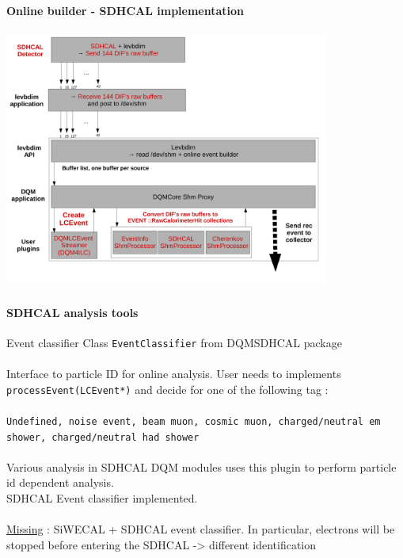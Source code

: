 \documentclass[8pt]{beamer}
\begin{document}
  \begin{frame}[containsverbatim]
    \frametitle{\secname}
    \framesubtitle{Online builder - SDHCAL implementation}
    \begin{center}
      \includegraphics[width=0.8\textwidth]{figs/DQMeventbuilder_sdhcal.pdf}
    \end{center}
  \end{frame}


  \begin{frame}[containsverbatim]
    \frametitle{\secname}
    \framesubtitle{SDHCAL analysis tools}
    \begin{block}{Event classifier}
      Class \verb|EventClassifier| from DQMSDHCAL package\\ ~\\
      Interface to particle ID for online analysis. User needs to implements \verb|processEvent(LCEvent*)| and decide for one of the following tag : \\
      ~ \\
      {\tt Undefined, noise event, beam muon, cosmic muon, charged/neutral em shower, charged/neutral had shower} \\
      ~ \\

      Various analysis in SDHCAL DQM modules uses this plugin to perform particle id dependent analysis. \\
      SDHCAL Event classifier implemented. \\~\\
      \underline{Missing} : SiWECAL + SDHCAL event classifier. In particular, electrons will be stopped before entering the SDHCAL -> different identification
    \end{block}
  \end{frame}
\end{document}
